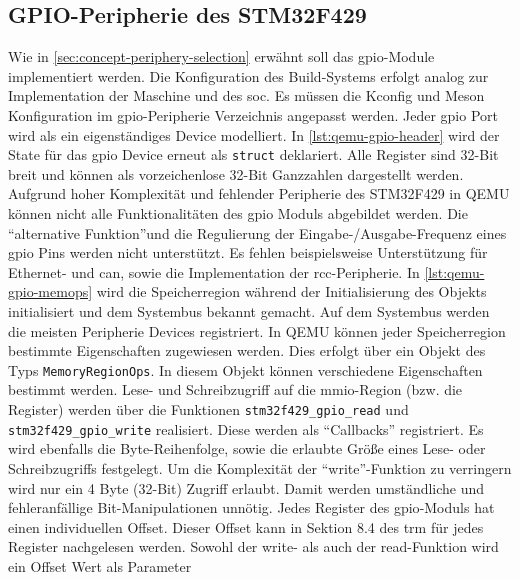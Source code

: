 \subsection{GPIO-Peripherie des STM32F429}

Wie in \ref{sec:concept-periphery-selection} erwähnt soll das \ac{gpio}-Module
implementiert werden.
Die Konfiguration des Build-Systems erfolgt analog zur Implementation der
Maschine und des \ac{soc}.
Es müssen die Kconfig und Meson Konfiguration im \ac{gpio}-Peripherie Verzeichnis
angepasst werden.
Jeder \ac{gpio} Port wird als ein eigenständiges Device modelliert.
In \ref{lst:qemu-gpio-header} wird der State für das \ac{gpio} Device erneut als
\texttt{struct} deklariert.
Alle Register sind 32-Bit breit und können als vorzeichenlose 32-Bit Ganzzahlen
dargestellt werden.
\newline
Aufgrund hoher Komplexität und fehlender Peripherie des STM32F429 in QEMU
können nicht alle Funktionalitäten des \ac{gpio} Moduls abgebildet werden.
Die \enquote{alternative Funktion}\footnotemark[3] und die Regulierung der
Eingabe-/Ausgabe-Frequenz eines \ac{gpio} Pins werden nicht unterstützt.
Es fehlen beispielsweise Unterstützung für Ethernet- und \ac{can}, sowie die
Implementation der \ac{rcc}-Peripherie.
In \ref{lst:qemu-gpio-memops} wird die Speicherregion während der
Initialisierung des Objekts initialisiert und dem Systembus bekannt gemacht.
Auf dem Systembus werden die meisten Peripherie Devices registriert.
In QEMU können jeder Speicherregion bestimmte Eigenschaften zugewiesen werden.
Dies erfolgt über ein Objekt des Typs \texttt{MemoryRegionOps}.
In diesem Objekt können verschiedene Eigenschaften bestimmt werden.
Lese- und Schreibzugriff auf die \ac{mmio}-Region (bzw. die Register) werden
über die Funktionen \texttt{stm32f429\_gpio\_read} und
\texttt{stm32f429\_gpio\_write} realisiert.
Diese werden als \enquote{Callbacks} registriert.
Es wird ebenfalls die Byte-Reihenfolge, sowie die erlaubte Größe eines Lese-
oder Schreibzugriffs festgelegt.
\newline
Um die Komplexität der \enquote{write}-Funktion zu verringern wird nur
ein 4 Byte (32-Bit) Zugriff erlaubt.
Damit werden umständliche und fehleranfällige Bit-Manipulationen unnötig.
Jedes Register des \ac{gpio}-Moduls hat einen individuellen Offset.
Dieser Offset kann in Sektion 8.4 des \ac{trm} für jedes Register nachgelesen
werden\cite{Stm32F4Trm}.
Sowohl der write- als auch der read-Funktion wird ein Offset Wert als Parameter
